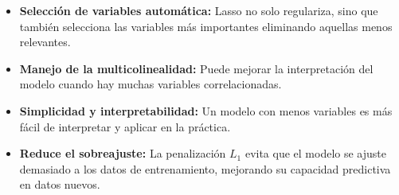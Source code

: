 \documentclass[
  letterpaper,
  DIV=11,
  numbers=noendperiod]{scrreprt}
\providecommand{\tightlist}{%
  \setlength{\itemsep}{0pt}\setlength{\parskip}{0pt}}
\begin{document}
\begin{tcolorbox}[enhanced jigsaw, leftrule=.75mm, breakable, colbacktitle=quarto-callout-note-color!10!white, bottomrule=.15mm, colframe=quarto-callout-note-color-frame, toprule=.15mm, colback=white, coltitle=black, bottomtitle=1mm, left=2mm, title=\textcolor{quarto-callout-note-color}{\faInfo}\hspace{0.5em}{Propiedades Clave}, opacityback=0, arc=.35mm, opacitybacktitle=0.6, toptitle=1mm, titlerule=0mm, rightrule=.15mm]

\begin{itemize}
\tightlist
\item
  \textbf{Selección de variables automática:} Lasso no solo regulariza,
  sino que también selecciona las variables más importantes eliminando
  aquellas menos relevantes.
\item
  \textbf{Manejo de la multicolinealidad:} Puede mejorar la
  interpretación del modelo cuando hay muchas variables correlacionadas.
\item
  \textbf{Simplicidad y interpretabilidad:} Un modelo con menos
  variables es más fácil de interpretar y aplicar en la práctica.
\item
  \textbf{Reduce el sobreajuste:} La penalización \(L_1\) evita que el
  modelo se ajuste demasiado a los datos de entrenamiento, mejorando su
  capacidad predictiva en datos nuevos.
\end{itemize}

\end{tcolorbox}
\end{document}
